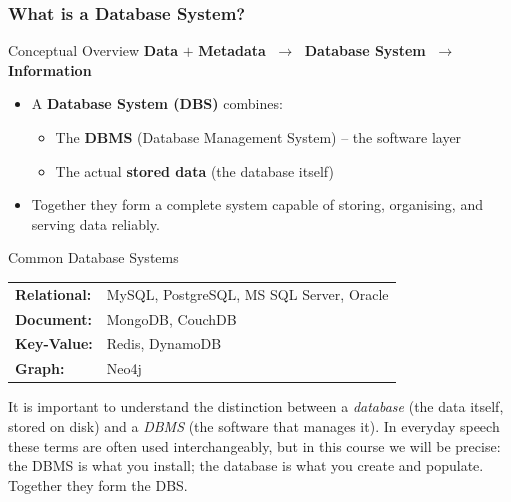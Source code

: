 \begin{frame}
  \frametitle{What is a Database System?}

  \begin{block}{Conceptual Overview}
    \centering
    \vspace{0.4em}
    \Large
    \textbf{Data} $+$ \textbf{Metadata}
    $\;\longrightarrow\;$
    \textbf{Database System}
    $\;\longrightarrow\;$
    \textbf{Information}
    \vspace{0.4em}
  \end{block}

  \vspace{0.5em}
  \begin{itemize}
    \item A \textbf{Database System (DBS)} combines:
    \begin{itemize}
      \item The \textbf{DBMS} (Database Management System) -- the software layer
      \item The actual \textbf{stored data} (the database itself)
    \end{itemize}
    \item Together they form a complete system capable of storing, organising, and serving data reliably.
  \end{itemize}

  \vspace{0.5em}
  \begin{examples}{Common Database Systems}
    \begin{tabular}{ll}
      \textbf{Relational:}    & MySQL, PostgreSQL, MS SQL Server, Oracle \\
      \textbf{Document:}      & MongoDB, CouchDB \\
      \textbf{Key-Value:}     & Redis, DynamoDB \\
      \textbf{Graph:}         & Neo4j \\
    \end{tabular}
  \end{examples}

  It is important to understand the distinction between a \emph{database} (the data itself, stored on disk) and a \emph{DBMS} (the software that manages it). In everyday speech these terms are often used interchangeably, but in this course we will be precise: the DBMS is what you install; the database is what you create and populate. Together they form the DBS.
\end{frame}

